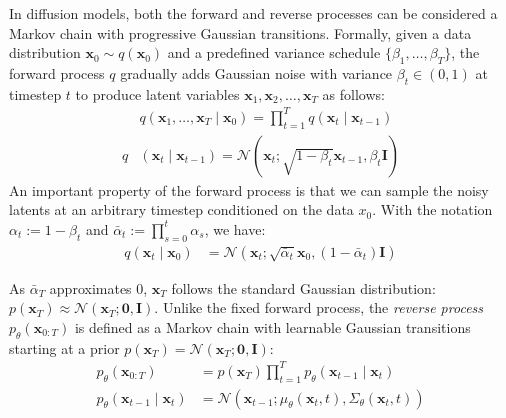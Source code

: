 \documentclass[11pt]{article}
\begin{document}
In diffusion models, both the forward and reverse processes can be considered a Markov chain with progressive Gaussian transitions. Formally, given a data distribution $\mathbf{x}_0 \sim q\left(\mathbf{x}_0\right)$ and a predefined variance schedule $\{\beta_{1}, \ldots, \beta_{T}\}$, the forward process $q$ gradually adds Gaussian noise with variance $\beta_t \in(0,1)$ at timestep $t$ to produce latent variables $\mathbf{x}_1, \mathbf{x}_2, \ldots, \mathbf{x}_T$ as follows:
\begin{align}
    &q\left(\mathbf{x}_1, \ldots, \mathbf{x}_T \mid \mathbf{x}_0\right) =\prod_{t=1}^T q\left(\mathbf{x}_t \mid \mathbf{x}_{t-1}\right) \\
q&\left(\mathbf{x}_t \mid \mathbf{x}_{t-1}\right)  =\mathcal{N}\left(\mathbf{x}_t; \sqrt{1-\beta_t} \mathbf{x}_{t-1}, \beta_t \mathbf{I}\right)
\end{align}
An important property of the forward process is that we can sample the noisy latents at an arbitrary timestep conditioned on the data $x_0$. With the notation $\alpha_t:=1-\beta_t$ and $\bar{\alpha}_t:=\prod_{s=0}^t \alpha_s$, we have:
\begin{align}
\label{eq:q_xt}
q\left(\mathbf{x}_t \mid \mathbf{x}_0\right) & =\mathcal{N}\left(\mathbf{x}_t ; \sqrt{\bar{\alpha}_t} \mathbf{x}_0,\left(1-\bar{\alpha}_t\right) \mathbf{I}\right)
\end{align}

\noindent As $\bar{\alpha}_T$ approximates 0, $\mathbf{x}_T$ follows the standard Gaussian distribution: $p\left(\mathbf{x}_T\right) \approx \mathcal{N}\left(\mathbf{x}_T; \mathbf{0}, \mathbf{I}\right)$. Unlike the fixed forward process, the \textit{reverse process} $p_\theta\left(\mathbf{x}_{0: T}\right)$ is defined as a Markov chain with learnable Gaussian transitions starting at a prior $p\left(\mathbf{x}_T\right)=\mathcal{N}\left(\mathbf{x}_T ; \mathbf{0}, \mathbf{I}\right)$:
\begin{align*}
p_\theta\left(\mathbf{x}_{0: T}\right)&=p\left(\mathbf{x}_T\right) \prod_{t=1}^T p_\theta\left(\mathbf{x}_{t-1} \mid \mathbf{x}_t\right) \\
p_\theta\left(\mathbf{x}_{t-1} \mid \mathbf{x}_t\right)&=\mathcal{N}\left(\mathbf{x}_{t-1} ; \mu_\theta\left(\mathbf{x}_t, t\right), \Sigma_\theta\left(\mathbf{x}_t, t\right)\right)
\end{align*}
\end{document}

